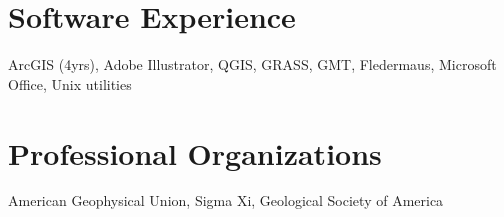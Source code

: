 \documentclass{cv_TOH}
\begin{document}
\section{Software Experience}
ArcGIS (4yrs), Adobe Illustrator, QGIS, GRASS, GMT, Fledermaus, Microsoft Office, Unix utilities

\section{Professional Organizations}
American Geophysical Union, Sigma Xi, Geological Society of America
\end{document}
